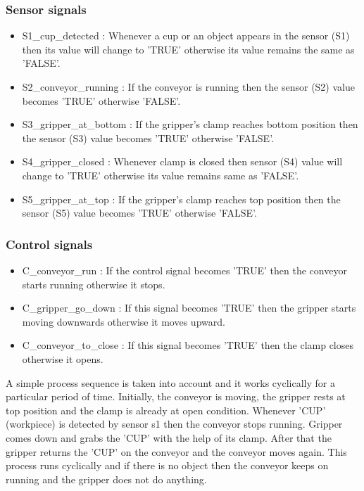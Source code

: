 \documentclass[conference]{IEEEtran}
\begin{document}
\subsubsection{Sensor signals} 
\begin{itemize}
  \item S1\_cup\_detected : Whenever a cup or an object appears in the sensor (S1) then its value will change to 'TRUE' otherwise its value remains the same as 'FALSE'. 
  \item  S2\_conveyor\_running : If the conveyor is running then the sensor (S2) value becomes 'TRUE' otherwise 'FALSE'.
  \item S3\_gripper\_at\_bottom : If the gripper's clamp reaches bottom position then the sensor (S3) value becomes 'TRUE' otherwise 'FALSE'.
  \item S4\_gripper\_closed : Whenever clamp is closed then  sensor (S4) value will change to 'TRUE' otherwise its value remains same as 'FALSE'.
  \item S5\_gripper\_at\_top : If the gripper's clamp reaches top position then the sensor (S5) value becomes 'TRUE' otherwise 'FALSE'.
\end{itemize} 

\subsubsection{Control signals}
\begin{itemize}
  \item C\_conveyor\_run : If the control signal becomes 'TRUE' then the conveyor starts running otherwise it stops.
  \item  C\_gripper\_go\_down : If this signal becomes 'TRUE' then the gripper starts moving downwards otherwise it moves upward.
  \item  C\_conveyor\_to\_close : If this signal becomes 'TRUE' then the clamp closes  otherwise it opens.
\end{itemize}


A simple process sequence is taken into account and it works cyclically for a particular period of time. Initially, the conveyor is moving, the gripper rests at top position and the clamp is already at open condition. Whenever 'CUP' (workpiece) is detected by sensor s1 then the conveyor stops running. Gripper comes down and grabs the 'CUP' with the help of its clamp. After that the gripper returns the 'CUP' on the conveyor and the conveyor moves again. This process runs cyclically and if there is no object then the conveyor keeps on running and the gripper does not do anything.
\end{document}
